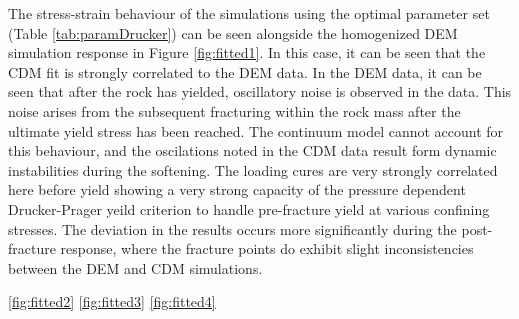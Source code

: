 The stress-strain behaviour of the simulations using the optimal parameter set (Table \ref{tab:paramDrucker}) can be seen alongside the homogenized DEM simulation response in Figure \ref{fig:fitted1}. In this case, it can be seen that the CDM fit is strongly correlated to the DEM data. In the DEM data, it can be seen that after the rock has yielded, oscillatory noise is observed in the data. This noise arises from the subsequent fracturing within the rock mass after the ultimate yield stress has been reached. The continuum model cannot account for this behaviour, and the oscilations noted in the CDM data result form dynamic instabilities during the softening. The loading cures are very strongly correlated here before yield showing a very strong capacity of the pressure dependent Drucker-Prager yeild criterion to handle pre-fracture yield at various confining stresses. The deviation in the results occurs more significantly during the post-fracture response, where the fracture points do exhibit slight inconsistencies between the DEM and CDM simulations. 

\ref{fig:fitted2}
\ref{fig:fitted3}
\ref{fig:fitted4}